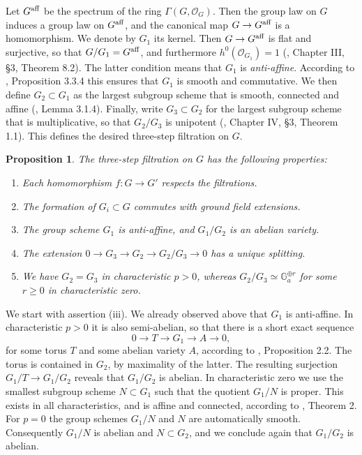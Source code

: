 \documentclass[oneside, 12pt]{amsart}
\newcommand\mylabel[1]{\label{#1}\marginpar{\raggedright\vspace{-1ex}\medskip\medskip\footnotesize \tt #1}}
\renewcommand\mylabel[1]{\label{#1}}
\newtheorem{proposition}[theorem]{Proposition}
\theoremstyle{definition}
\theoremstyle{remark}
\newcommand{\GG}{\mathbb{G}}
\newcommand{\aff}{\text{\rm aff}}
\newcommand{\lra}{\longrightarrow}
\renewcommand{\O}{\mathscr{O}}
\newcommand{\ra}{\rightarrow}
\begin{document}
Let $G^\aff$ be the spectrum of the ring $\Gamma(G,\O_G)$.
Then the group law on $G$ induces a group law on $G^\aff$, and the canonical map $G\ra G^\aff$ is a homomorphism.
We denote by $G_1$ its kernel. Then $G\ra G^\aff$ is flat and surjective, so that $G/G_1=G^\aff$, and furthermore $h^0(\O_{G_1})=1$
(\cite{Demazure; Gabriel 1970}, Chapter III, \S3, Theorem 8.2).  
The latter condition means that $G_1$ is \emph{anti-affine}. 
According to \cite{Brion 2017}, Proposition 3.3.4 this ensures that $G_1$ is smooth and commutative.
We then define $G_2\subset G_1$ as the largest subgroup scheme that is smooth, connected and affine (\cite{Brion 2017}, Lemma 3.1.4).
Finally, write $G_3\subset G_2$ for the largest subgroup scheme that is multiplicative, so that $G_2/G_3$
is unipotent (\cite{Demazure; Gabriel 1970}, Chapter IV, \S3, Theorem 1.1). This defines the desired  three-step   filtration on $G$.
 
\begin{proposition}
\mylabel{three step filtration}
The three-step filtration on $G$ has the following properties:
\begin{enumerate}
\item Each homomorphism $f:G\ra G'$ respects the filtrations.
\item The formation of $G_i\subset G$ commutes with ground field extensions.
\item The group scheme $G_1$ is anti-affine, and    $G_1/G_2$ is an abelian variety.
\item The extension $0\ra G_3\ra G_2\ra G_2/G_3\ra 0$ has a unique splitting.
 \item We have $G_2=G_3$   in characteristic $p>0$, whereas $G_2/G_3\simeq\GG_a^{\oplus r}$ for some $r\geq 0$
in characteristic zero.
\end{enumerate}
\end{proposition}

\proof
We start with assertion (iii). We already observed above that $G_1$ is anti-affine.
In characteristic $p>0$ it is also semi-abelian, so that there is a short exact sequence
\begin{equation}
\label{semiabelian}
0\lra T\lra G_1\lra A\lra 0,
\end{equation}
for some torus $T$ and some abelian variety $A$, according to \cite{Brion 2009}, Proposition 2.2.
The torus is contained in $G_2$, by maximality of the latter. The resulting surjection $G_1/T\ra G_1/G_2$ reveals that $G_1/G_2$ is abelian.
In characteristic zero we use  the smallest subgroup scheme $N\subset G_1$ such that the quotient  $G_1/N$ is proper.
This exists in all characteristics, and is affine and connected, according to \cite{Brion 2017}, Theorem 2.
For $p=0$ the group schemes $G_1/N$ and $N$ are automatically smooth. Consequently 
$G_1/N$ is abelian and $N\subset G_2$, and  we conclude again that $G_1/G_2$ is abelian.
\end{document}
